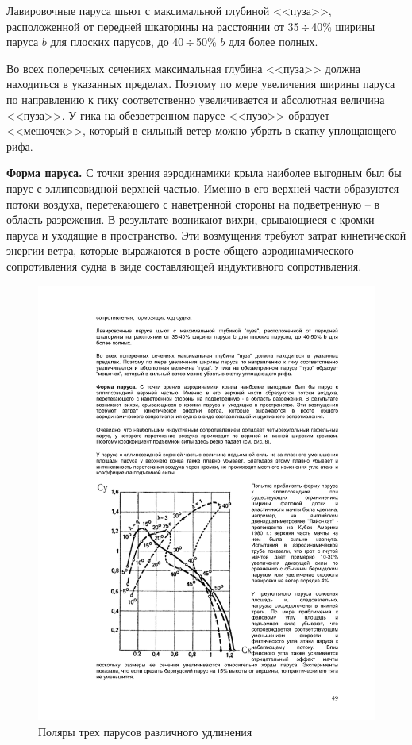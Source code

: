 \documentclass[a4paper, 12pt, twoside, final, book, russian, fittopage, cyremdash]{ncc}
\newcommand{\otdo}{\,\ensuremath{\div}\,}
\begin{document}
Лавировочные паруса шьют с максимальной глубиной <<пуза>>, расположенной от передней шкаторины на расстоянии от 35\otdo 40\% ширины паруса $b$ для плоских парусов, до 40\otdo 50\% $b$ для более полных.

Во всех поперечных сечениях максимальная глубина <<пуза>> должна находиться в указанных пределах. Поэтому по мере увеличения ширины паруса по направлению к гику соответственно увеличивается и абсолютная величина <<пуза>>. У гика на обезветренном парусе <<пузо>> образует <<мешочек>>, который в сильный ветер можно убрать в скатку уплощающего рифа.

\textbf{Форма паруса.} С точки зрения аэродинамики крыла наиболее выгодным был бы парус с эллипсовидной верхней частью. Именно в его верхней части образуются потоки воздуха, перетекающего с наветренной стороны на подветренную \--- в область разрежения. В результате возникают вихри, срывающиеся с кромки паруса и уходящие в пространство. Эти возмущения требуют затрат кинетической энергии ветра, которые выражаются в росте общего аэродинамического сопротивления судна в виде составляющей индуктивного сопротивления. 

\begin{figure}[htb]
  \centering
  \includegraphics[scale=1]{0028}
  \caption{Поляры трех парусов различного удлинения}
  \label{fig:28}
\end{figure}
\end{document}
